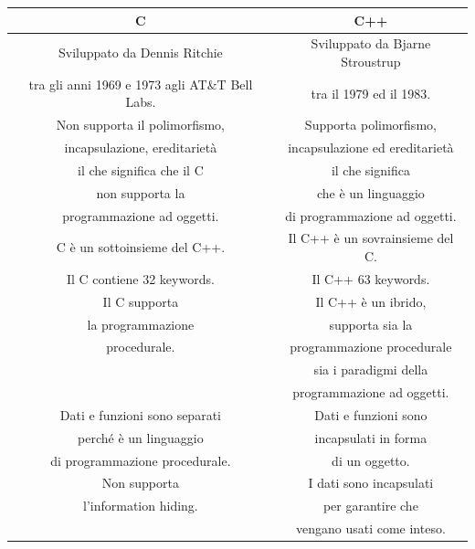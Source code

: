 \begin{longtable}{|c|c|}
	\hline
	\textbf{C} & \textbf{C++} \\
	\hline
	\endhead
	\textsf{\small Sviluppato da Dennis Ritchie } & \textsf{\small Sviluppato da Bjarne Stroustrup } \\
	\textsf{\small tra gli anni 1969 e 1973 agli AT\&T Bell Labs.} & \textsf{\small tra il 1979 ed il 1983.} \\
	\hline
	\textsf{\small Non supporta il polimorfismo,  } & \textsf{\small Supporta polimorfismo,  } \\
	\textsf{\small incapsulazione, ereditarietà} & \textsf{\small incapsulazione ed ereditarietà} \\
	\textsf{\small  il che significa che il C} & \textsf{\small il che significa} \\
	\textsf{\small non supporta la} & \textsf{\small  che è un linguaggio} \\
	\textsf{\small programmazione ad oggetti.} & \textsf{\small  di programmazione ad oggetti.} \\
	\hline
	\textsf{\small C è un sottoinsieme del C++.} & \textsf{\small Il C++ è un sovrainsieme del C.} \\
	\hline
	\textsf{\small Il C contiene 32 keywords.} & \textsf{\small Il C++ 63 keywords.} \\
	\hline
	\textsf{\small Il C supporta  } & \textsf{\small Il C++ è un ibrido, } \\
	\textsf{\small la programmazione } & \textsf{\small supporta sia la } \\
	\textsf{\small procedurale.} & \textsf{\small programmazione procedurale} \\
	\textsf{\small } & \textsf{\small sia i paradigmi della} \\
	\textsf{\small } & \textsf{\small programmazione ad oggetti.} \\
	\hline
	\textsf{\small Dati e funzioni sono separati} & \textsf{\small Dati e funzioni sono} \\
	\textsf{\small perché è un linguaggio} & \textsf{\small incapsulati in forma} \\
	\textsf{\small di programmazione procedurale.} & \textsf{\small di un oggetto.} \\
	\hline
	\textsf{\small Non supporta } & \textsf{\small I dati sono incapsulati } \\
	\textsf{\small l'information hiding.} & \textsf{\small per garantire che } \\
	\textsf{\small } & \textsf{\small vengano usati come inteso.} \\

\end{longtable}
